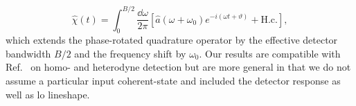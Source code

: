 \begin{equation}
	\hat\chi(t)
	=
	\int_0^{B/2}\frac{\dd{\omega}}{2\pi}
	\left[
		\hat{a}(\omega+\omega_0)
		e^{-i(\omega t+\vartheta)}
		+
		\text{H.c.}
	\right]
	,
\end{equation}
which extends the phase-rotated quadrature operator by the effective detector bandwidth $B/2$ and the frequency shift by $\omega_0$.
Our results are compatible with Ref.~\cite{Gardiner2000,Shapiro2009,Loudon2000,Vogel2006,Kikuchi2016} on homo- and heterodyne detection but are more general in that we do not assume a particular input coherent-state and included the detector response as well as \gls{lo} lineshape.